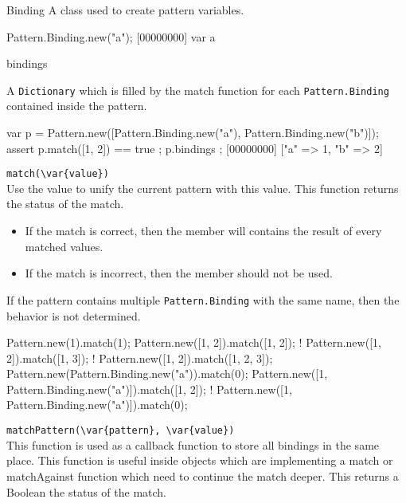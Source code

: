 \begin{urbiscriptapi}

\item[Binding]
  A class used to create pattern variables.

\begin{urbiscript}
Pattern.Binding.new("a");
[00000000] var a
\end{urbiscript}

\item[bindings]

  A \lstinline|Dictionary| which is filled by the match function for each
  \lstinline|Pattern.Binding| contained inside the pattern.

\begin{urbiscript}
{
  var p = Pattern.new([Pattern.Binding.new("a"), Pattern.Binding.new("b")]);
  assert {
    p.match([1, 2]) == true
  };
  p.bindings
};
[00000000] ["a" => 1, "b" => 2]
\end{urbiscript}


\item \lstinline|match(\var{value})|\\

  Use the value to unify the current pattern with this value.  This function
  returns the status of the match.
  \begin{itemize}
    \item If the match is correct, then the  member will
      contains the result of every matched values.
    \item If the match is incorrect, then the  member should
      not be used.
  \end{itemize}
  If the pattern contains multiple \lstinline|Pattern.Binding| with the same
  name, then the behavior is not determined.

\begin{urbiassert}
Pattern.new(1).match(1);
Pattern.new([1, 2]).match([1, 2]);
! Pattern.new([1, 2]).match([1, 3]);
! Pattern.new([1, 2]).match([1, 2, 3]);
Pattern.new(Pattern.Binding.new("a")).match(0);
Pattern.new([1, Pattern.Binding.new("a")]).match([1, 2]);
! Pattern.new([1, Pattern.Binding.new("a")]).match(0);
\end{urbiassert}


\item \lstinline|matchPattern(\var{pattern}, \var{value})|\\

  This function is used as a callback function to store all bindings in the
  same place.  This function is useful inside objects which are implementing
  a match or matchAgainst function which need to continue the match deeper.
  This returns a Boolean the status of the match.


\end{urbiscriptapi}
